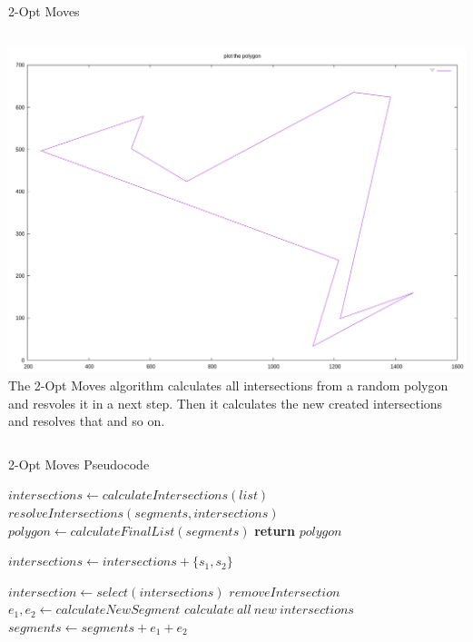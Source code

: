 \documentclass{beamer}
\begin{document}
\begin{frame}{2-Opt Moves}
  \begin{block}{}
    \begin{columns}[onlytextwidth,T]
      \column{\dimexpr\linewidth-40mm}
      \includegraphics[width=0.5\paperwidth]{figures/kk-two-opt-moves-10-0-0.png}
      \column{40mm}
      The 2-Opt Moves algorithm calculates all intersections from a random
      polygon and resvoles it in a next step. Then it calculates the new created
      intersections and resolves that and so on.
    \end{columns}
  \end{block}
\end{frame}

\begin{frame}{2-Opt Moves Pseudocode}
  \begin{algorithm}[H]
    \tiny
    \begin{algorithmic}[0]
        \State $intersections \gets calculateIntersections(list)$
        \State $resolveIntersections(segments, intersections)$
        \State $polygon \gets calculateFinalList(segments)$
        \State \textbf{return} $polygon$
      \EndProcedure

              \State $intersections \gets intersections + \{s_1, s_2\}$
            \EndIf
          \EndFor
        \EndFor
      \EndProcedure

          \State $intersection \gets select(intersections)$
          \State $removeIntersection$
          \State $e_1, e_2 \gets calculateNewSegment$
          \State $calculate\ all\ new\ intersections$
          \State $segments \gets segments + e_1 + e_2$
        \EndFor
      \EndProcedure
    \end{algorithmic}
  \end{algorithm}
\end{frame}
\end{document}

